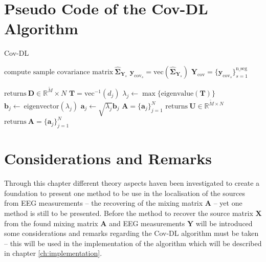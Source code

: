\section{Pseudo Code of the Cov-DL Algorithm}\label{seg:alg_cov}
\begin{algorithm}[H]
\caption{Cov-DL}
\begin{algorithmic}[1]
				\State$\text{compute sample covariance matrix}\ \widehat{\boldsymbol{\Sigma}}_{\textbf{Y}_s} $
				\State$\textbf{y}_{\text{cov}_s} = \text{vec}(\widehat{\boldsymbol{\Sigma}}_{\textbf{Y}_s})$	
			\EndFor			
			\State$\textbf{Y}_{\text{cov}} = \{\textbf{y}_{\text{cov}_s}\}_{s=1}^{\text{n\_seg}}$
			
			\State$\text{returns} \ \textbf{D} \in \mathbb{R}^{\widetilde{M}}\times N$
			\EndProcedure
			\State$\textbf{T} = \text{vec}^{-1}(d_j)$            
			\State$\lambda_j\gets \max\{\text{eigenvalue}(\textbf{T})\}$
			\State$\textbf{b}_j \gets \ \text{eigenvector}(\lambda_j)$
			\State$\textbf{a}_j \gets \sqrt{\lambda_j}\textbf{b}_j$
			\EndFor
			\State$\textbf{A} = \{\textbf{a}_j\}_{j=1}^N$
			\EndIf
			\State
				\State$\text{returns} \ \textbf{U}\in \mathbb{R}^{\widetilde{M}\times N}$
				\EndProcedure
				\State$\text{returns}\ \textbf{A}= \{\textbf{a}_j\}_{j=1}^{N}$
				\EndProcedure
			\EndIf
           \EndProcedure
        \end{algorithmic} 
        \label{alg:Cov1}
\end{algorithm}

\section{Considerations and Remarks}
Through this chapter different theory aspects haven been investigated to create a foundation to present one method to be use in the localisation of the sources from EEG measurements -- the recovering of the mixing matrix $\mathbf{A}$ -- yet one method is still to be presented.
Before the method to recover the source matrix $\mathbf{X}$ from the found mixing matrix $\mathbf{A}$ and EEG measurements $\mathbf{Y}$ will be introduced some considerations and remarks regarding the Cov-DL algorithm must be taken -- this will be used in the implementation of the algorithm which will be described in chapter \ref{ch:implementation}.

